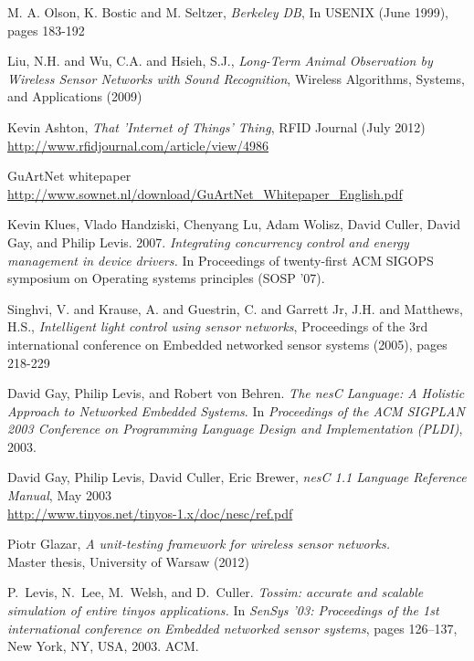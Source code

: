 \begin{thebibliography}{99}

M. A. Olson, K. Bostic and M. Seltzer,
\textit{Berkeley DB},
In USENIX (June 1999), pages 183-192

Liu, N.H. and Wu, C.A. and Hsieh, S.J.,
\textit{Long-Term Animal Observation by Wireless Sensor Networks with Sound Recognition},
Wireless Algorithms, Systems, and Applications (2009)

Kevin Ashton,
\textit{That 'Internet of Things' Thing},
RFID Journal (July 2012) \url{http://www.rfidjournal.com/article/view/4986}

GuArtNet whitepaper \url{http://www.sownet.nl/download/GuArtNet\_Whitepaper\_English.pdf}

  Kevin Klues, Vlado Handziski, Chenyang Lu, Adam Wolisz, David Culler, David Gay, and Philip Levis. 2007.
  \textit{Integrating concurrency control and energy management in device drivers.}
  In Proceedings of twenty-first ACM SIGOPS symposium on Operating systems principles (SOSP '07). 

Singhvi, V. and Krause, A. and Guestrin, C. and Garrett Jr, J.H. and Matthews, H.S.,
\textit{Intelligent light control using sensor networks},
Proceedings of the 3rd international conference on Embedded networked sensor systems (2005), pages 218-229

  David Gay, Philip Levis, and Robert von Behren.
  \textit{The nesC Language: A Holistic Approach
  to Networked Embedded Systems}.  \newblock In
  {\em Proceedings of the ACM SIGPLAN 2003
  Conference on Programming Language Design and
  Implementation (PLDI)}, 2003.

  David Gay, Philip Levis, David Culler, Eric Brewer,
  \textit{nesC 1.1 Language Reference Manual},
  May 2003 \\
  \url{http://www.tinyos.net/tinyos-1.x/doc/nesc/ref.pdf}


  Piotr Glazar, \textit{A unit-testing framework
  for wireless sensor networks.} \\ Master thesis,
  University of Warsaw (2012)

  P.~Levis, N.~Lee, M.~Welsh, and D.~Culler.
  \textit{Tossim: accurate and scalable
  simulation of entire tinyos applications.}
  \newblock In {\em SenSys '03: Proceedings of the
  1st international conference on Embedded
  networked sensor systems}, pages 126--137, New
  York, NY, USA, 2003. ACM.


\end{thebibliography}

